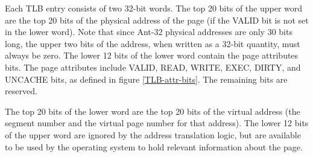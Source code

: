 Each TLB entry consists of two 32-bit words.  The top 20 bits of the
upper word are the top 20 bits of the physical address of the page (if
the VALID bit is not set in the lower word).  Note that since Ant-32
physical addresses are only 30 bits long, the upper two bits of the
address, when written as a 32-bit quantity, must always be zero.  The
lower 12 bits of the lower word contain the page attributes bits.  The
page attributes include {\sc VALID}, {\sc READ}, {\sc WRITE}, {\sc
EXEC}, {\sc DIRTY}, and {\sc UNCACHE} bits, as defined in figure
\ref{TLB-attr-bits}.  The remaining bits are reserved.

The top 20 bits of the lower word are the top 20 bits of the virtual
address (the segment number and the virtual page number for that
address).  The lower 12 bits of the upper word are ignored by the
address translation logic, but are available to be used by the
operating system to hold relevant information about the page.

